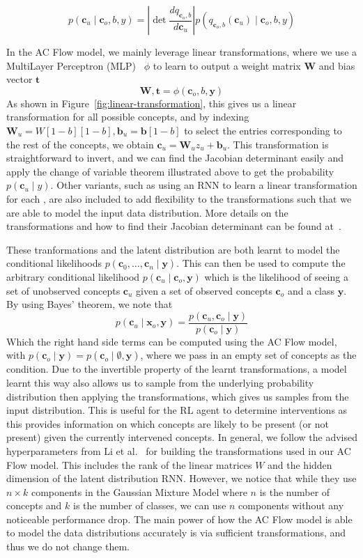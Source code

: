 \[p(\mathbf{c}_u \mid \mathbf{c}_o, b, y) = \left | 
\mathop{\mathrm{det}} \frac{d q_{\mathbf{c}_o, b}}{d \mathbf{c}_u}
\right | p(q_{\mathbf{c}_o, b}(\mathbf{c}_u) \mid \mathbf{c}_o, b, y)\]

In the AC Flow model, we mainly leverage
linear transformations, where we use a MultiLayer Perceptron (MLP)~\cite{feedforward} $\phi$ to learn 
to output a weight matrix $\mathbf{W}$ and bias vector $\mathbf{t}$
\[\mathbf{W}, \mathbf{t} = \phi(\mathbf{c}_o, b, \mathbf{y})\]
As shown in Figure~\ref{fig:linear-transformation},
this gives us a linear transformation for all possible concepts,
and by indexing $\mathbf{W}_{u} = W[1-b][1-b], \mathbf{b}_{u} = \mathbf{b}[1-b]$
to select the entries corresponding to the rest of the concepts, we obtain
$\mathbf{c}_u = \mathbf{W}_{u}z_u + \mathbf{b}_{u}$. This transformation is 
straightforward to invert, and we can find the Jacobian determinant easily and apply the change of variable
theorem illustrated above to get the probability $p(\mathbf{c}_u \mid y)$.
Other variants, such as using an RNN to learn a linear transformation
for each , are also included to add flexibility to the transformations such that
we are able to model the input data distribution. More details on the transformations
 and how to find their Jacobian determinant can be found at~\cite{tans}.

These tranformations and the latent distribution are both learnt to
 model the conditional likelihoods $p(\mathbf{c}_0, \ldots, \mathbf{c}_n \mid \mathbf{y})$.
This can then be used to compute the arbitrary conditional likelihood $p(\mathbf{c}_u \mid \mathbf{c}_o, \mathbf{y})$
which is the likelihood of
seeing a set of unobserved concepts $\mathbf{c}_u$
given a set of observed concepts $\mathbf{c}_o$ and a class $\mathbf{y}$. 
By using Bayes' theorem, we note that
\[p(\mathbf{c}_u \mid \mathbf{x}_o, \mathbf{y}) = \frac{p(\mathbf{c}_u, \mathbf{c}_o \mid \mathbf{y})}
{p(\mathbf{c}_o \mid \mathbf{y})}\]
Which the right hand side terms can be computed using the AC Flow model, with
$p(\mathbf{c}_o \mid \mathbf{y}) = p(\mathbf{c}_o \mid \emptyset, \mathbf{y})$, where we 
pass in an empty set of concepts as the condition.
Due to the invertible property of the learnt transformations,
a model learnt this way also allows us to sample from the underlying probability 
distribution then applying the transformations, which gives us 
samples from the input distribution.
This is useful for the RL agent to
determine interventions as
this provides information on which concepts are likely to be present 
(or not present) given the currently intervened
concepts.
In general, we follow the advised hyperparameters from Li et al.~\cite{acflow}
for building the transformations used in our AC Flow model. This includes the rank of the linear
matrices $W$ and the hidden dimension of the latent distribution RNN. However, we notice that while
they use $n \times k$ components in the Gaussian Mixture Model where $n$ is the number of concepts
and $k$ is the number of classes, we can use $n$ components without any noticeable performance drop. 
The main power of how the AC Flow model is able to model the data distributions accurately
is via sufficient transformations, and thus we do not change them.

